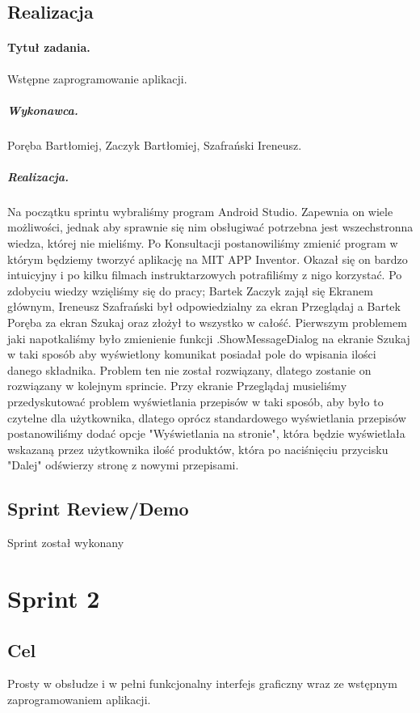 \documentclass[a4paper]{article}
\begin{document}
\subsection{Realizacja}

\paragraph{Tytuł zadania.} Wstępne zaprogramowanie aplikacji.
\subparagraph{Wykonawca.} Poręba Bartłomiej, Zaczyk Bartłomiej, Szafrański Ireneusz.
\subparagraph{Realizacja.} Na początku sprintu wybraliśmy program Android Studio. Zapewnia on wiele możliwości, jednak aby sprawnie się nim obsługiwać potrzebna jest wszechstronna wiedza, której nie mieliśmy. Po Konsultacji postanowiliśmy zmienić program w którym będziemy tworzyć aplikację na MIT APP Inventor. Okazał się on bardzo intuicyjny i po kilku filmach instruktarzowych potrafiliśmy z nigo korzystać. Po zdobyciu wiedzy wzięliśmy się do pracy; Bartek Zaczyk zajął się Ekranem głównym, Ireneusz Szafrański był odpowiedzialny za ekran Przeglądaj a Bartek Poręba za ekran Szukaj oraz złożył to wszystko w całość. Pierwszym problemem jaki napotkaliśmy było zmienienie funkcji .ShowMessageDialog na ekranie Szukaj w taki sposób aby wyświetlony komunikat posiadał pole do wpisania ilości danego składnika. Problem ten nie został rozwiązany, dlatego zostanie on rozwiązany w kolejnym sprincie. Przy ekranie Przeglądaj musieliśmy przedyskutować problem wyświetlania przepisów w taki sposób, aby było to czytelne dla użytkownika, dlatego oprócz standardowego wyświetlania przepisów postanowiliśmy dodać opcje "Wyświetlania na stronie", która będzie wyświetlała wskazaną przez użytkownika ilość produktów, która po naciśnięciu przycisku "Dalej" odświerzy stronę z nowymi przepisami.


\subsection{Sprint Review/Demo}
Sprint został wykonany



\section{Sprint 2}

\subsection{Cel} Prosty w obsłudze i w pełni funkcjonalny interfejs graficzny wraz ze wstępnym zaprogramowaniem aplikacji.
\end{document}
